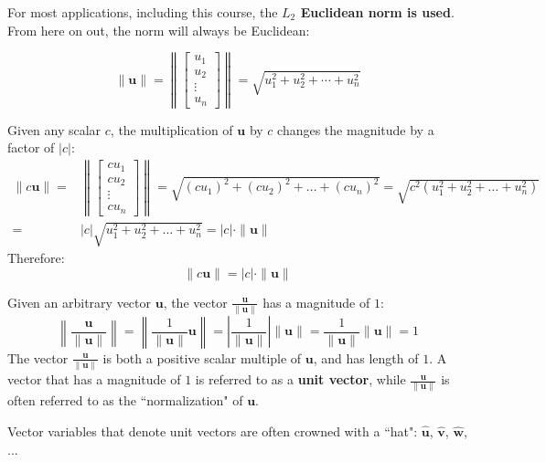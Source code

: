 \documentclass{article}
\begin{document}
For most applications, including this course, the {\bf \(L_2\) Euclidean norm is used}. From here on out, the norm will always be Euclidean:

\[\|\mathbf{u}\| = \left\|\begin{bmatrix} u_1 \\ u_2 \\ \vdots \\ u_n \end{bmatrix}\right\| = \sqrt{u_1^2 + u_2^2 + \cdots + u_n^2}\]

Given any scalar \(c\), the multiplication of \(\mathbf{u}\) by \(c\) changes the magnitude by a factor of \(|c|\): 
\begin{align*}
\|c\mathbf{u}\| 
= & \left\|\begin{bmatrix} c u_1 \\ c u_2 \\ \vdots \\ c u_n \end{bmatrix}\right\|
= \sqrt{(c u_1)^2 + (c u_2)^2 + \dots + (c u_n)^2}
= \sqrt{c^2(u_1^2 + u_2^2 + \dots + u_n^2)} \\
= & |c| \sqrt{u_1^2 + u_2^2 + \dots + u_n^2} 
= |c| \cdot \|\mathbf{u}\|
\end{align*}
Therefore:
\[\|c\mathbf{u}\| = |c|\cdot\|\mathbf{u}\|\]

Given an arbitrary vector \(\mathbf{u}\), the vector \(\frac{\mathbf{u}}{\|\mathbf{u}\|}\) has a magnitude of \(1\):
\[\left\|\frac{\mathbf{u}}{\|\mathbf{u}\|}\right\| = \left\|\frac{1}{\|\mathbf{u}\|}\mathbf{u}\right\| = \left|\frac{1}{\|\mathbf{u}\|}\right|\|\mathbf{u}\| = \frac{1}{\|\mathbf{u}\|}\|\mathbf{u}\| = 1\]
The vector \(\frac{\mathbf{u}}{\|\mathbf{u}\|}\) is both a positive scalar multiple of \(\mathbf{u}\), and has length of \(1\). A vector that has a magnitude of \(1\) is referred to as a {\bf unit vector}, while \(\frac{\mathbf{u}}{\|\mathbf{u}\|}\) is often referred to as the ``normalization" of \(\mathbf{u}\).

Vector variables that denote unit vectors are often crowned with a ``hat": \(\hat{\mathbf{u}}\), \(\hat{\mathbf{v}}\), \(\hat{\mathbf{w}}\), ...
\end{document}

